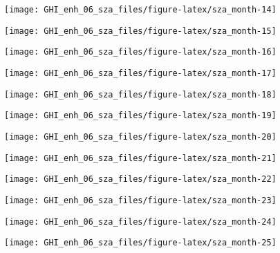 \documentclass[
  10pt,
  a4paper,oneside]{article}
\begin{document}
\begin{center}\texttt{[image: GHI\_enh\_06\_sza\_files/figure-latex/sza\_month-14]} \end{center}

\begin{center}\texttt{[image: GHI\_enh\_06\_sza\_files/figure-latex/sza\_month-15]} \end{center}

\begin{center}\texttt{[image: GHI\_enh\_06\_sza\_files/figure-latex/sza\_month-16]} \end{center}

\begin{center}\texttt{[image: GHI\_enh\_06\_sza\_files/figure-latex/sza\_month-17]} \end{center}

\begin{center}\texttt{[image: GHI\_enh\_06\_sza\_files/figure-latex/sza\_month-18]} \end{center}

\begin{center}\texttt{[image: GHI\_enh\_06\_sza\_files/figure-latex/sza\_month-19]} \end{center}

\begin{center}\texttt{[image: GHI\_enh\_06\_sza\_files/figure-latex/sza\_month-20]} \end{center}

\begin{center}\texttt{[image: GHI\_enh\_06\_sza\_files/figure-latex/sza\_month-21]} \end{center}

\begin{center}\texttt{[image: GHI\_enh\_06\_sza\_files/figure-latex/sza\_month-22]} \end{center}

\begin{center}\texttt{[image: GHI\_enh\_06\_sza\_files/figure-latex/sza\_month-23]} \end{center}

\begin{center}\texttt{[image: GHI\_enh\_06\_sza\_files/figure-latex/sza\_month-24]} \end{center}

\begin{center}\texttt{[image: GHI\_enh\_06\_sza\_files/figure-latex/sza\_month-25]} \end{center}
\end{document}

